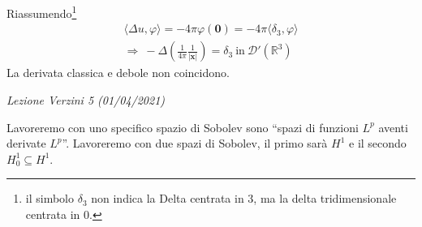 \documentclass[10pt,a4paper,twoside,openright]{book}
\begin{document}
Riassumendo\footnote{il simbolo $\displaystyle \delta _{3}$ non indica la Delta centrata in $\displaystyle 3$, ma la delta tridimensionale centrata in $\displaystyle 0$.}
\begin{gather*}
	\langle \Delta u,\varphi \rangle =-4\pi \varphi (\mathbf{0}) =-4\pi \langle \delta _{3} ,\varphi \rangle \\
	\Rightarrow \ -\Delta \left(\frac{1}{4\pi }\frac{1}{| \mathbf{x}| }\right) =\delta_{3}  \ \text{in} \ \mathcal{D} '\left(\mathbb{R}^{3}\right)
\end{gather*}
La derivata classica e debole non coincidono.

\textit{Lezione Verzini 5 (01/04/2021)}

Lavoreremo con uno specifico spazio di Sobolev sono ``spazi di funzioni $L^{p}$ aventi derivate $L^{p}$''. Lavoreremo con due spazi di Sobolev, il primo sarà $H^{1}$ e il secondo $H^{1}_{0} \subseteq H^{1}$.
\end{document}
